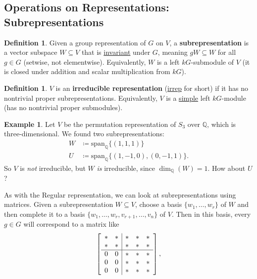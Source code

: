 \documentclass[12pt]{article}
\newcommand{\q}{\mathbb{Q}}
\newcommand{\ita}[1]{\textit{#1}}
\newcommand{\spank}[1]{\mathrm{span}_{#1}}
\theoremstyle{definition}
\newtheorem{definition}[theorem]{Definition}
\newtheorem{example}{Example}[section]
\begin{document}
\subsection{Operations on Representations: Subrepresentations}
\begin{definition}
    Given a group representation of $G$ on $V$, a \textbf{subrepresentation} is a vector subspace $W\subseteq V$ that is \underline{invariant} under $G$, meaning $gW\subseteq W$ for all $g\in G$ (setwise, not elementwise). Equivalently, $W$ is a left $kG$-submodule of $V$ (it is closed under addition and scalar multiplication from $kG$).
\end{definition}
\begin{definition}
    $V$ is an \textbf{irreducible representation} (\underline{irrep} for short) if it has no nontrivial proper subrepresentations. Equivalently, $V$ is a \underline{simple} left $kG$-module (has no nontrivial proper submodules).
\end{definition}
\begin{example}
    Let $V$ be the permutation representation of $S_3$ over $\q$, which is three-dimensional. We found two subrepresentations:
    \begin{equation}
        \begin{split}
            W&\coloneqq \spank{\q}\{(1,1,1)\}\\
            U&\coloneqq \spank{\q}\{(1,-1,0),(0,-1,1)\}.
        \end{split}
    \end{equation}
    So $V$ is \ita{not} irreducible, but $W$ \ita{is} irreducible, since $\dim_{\q}(W)=1$. How about $U$?
\end{example}
As with the Regular representation, we can look at subrepresentations using matrices. Given a subrepresentation $W\subseteq V$, choose a basis $\{w_1,\dotsc,w_r\}$ of $W$ and then complete it to a basis $\{w_1,\dotsc,w_r,v_{r+1},\dotsc,v_n\}$ of $V$. Then in this basis, every $g\in G$ will correspond to a matrix like
\begin{equation}
    \left[\begin{array}{c c | c c c}
        * & * & * & * & * \\
        * & * & * & * & * \\
        \hline 
        0 & 0 & * & * & * \\
        0 & 0 & * & * & * \\
        0 & 0 & * & * & *
    \end{array}
    \right],
\end{equation}
\end{document}
